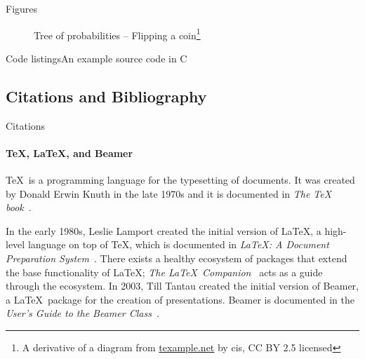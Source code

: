 \documentclass{beamer}
\begin{document}
{{\begin{frame}[label=figs2]{Figures}
\begin{figure}[b]
{}
        \caption{Tree of probabilities -- Flipping a coin\footnote[frame]{%
          A derivative of a diagram from \url{texample.net} by cis, CC BY 2.5 licensed}}
      \end{figure}
    \end{frame}

    \begin{frame}{Code listings}{An example source code in C}
      \sleepSort
    \end{frame}

    \subsection{Citations and Bibliography}
    \begin{frame}[label=citations]{Citations}
      \framesubtitle{\TeX, \LaTeX, and Beamer}
\hspace{1 em}
      \justifying\TeX\ is a programming language for the typesetting
      of documents. It was created by Donald Erwin Knuth in the late
      1970s and it is documented in \emph{The \TeX
      book}~\cite{knuth84}.

      In the early 1980s, Leslie Lamport created the initial version
      of \LaTeX, a high-level language on top of \TeX, which is
      documented in \emph{\LaTeX : A Document Preparation
      System}~\cite{lamport94}. There exists a healthy ecosystem of
      packages that extend the base functionality of \LaTeX;
      \emph{The \LaTeX\ Companion}~\cite{MG94} acts as a guide
      through the ecosystem.  In 2003, Till Tantau created the initial version of Beamer, a
      \LaTeX\ package for the creation of presentations. Beamer is
      documented in the \emph{User's Guide to the Beamer
      Class}~\cite{tantau04}.
    \end{frame}

}}
\end{document}
